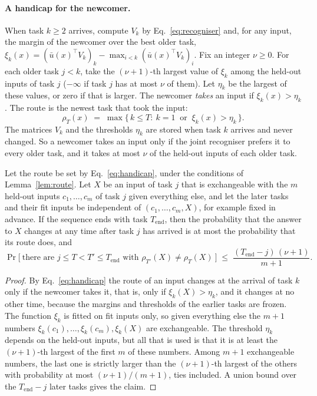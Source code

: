 \paragraph{A handicap for the newcomer.} When task $k \ge 2$ arrives, compute $V_k$ by
Eq.~\eqref{eq:recogniser} and, for any input, the margin of the newcomer over the best older task,
$\xi_k(x) = (\bar u(x)^{\!\top} V_k)_k - \max_{i < k} (\bar u(x)^{\!\top} V_k)_i$. Fix an integer
$\nu \ge 0$. For each older task $j < k$, take the $(\nu+1)$-th largest value of $\xi_k$ among the
held-out inputs of task $j$ ($-\infty$ if task $j$ has at most $\nu$ of them). Let $\eta_k$ be the
largest of these values, or zero if that is larger. The newcomer \emph{takes} an input if
$\xi_k(x) > \eta_k$. The route is the newest task that took the input:
\begin{equation}
  \rho_T(x) \;=\; \max\bigl\{\, k \le T : \ k = 1 \ \text{ or } \ \xi_k(x) > \eta_k \,\bigr\} .
  \label{eq:handicap}
\end{equation}
The matrices $V_k$ and the thresholds $\eta_k$ are stored when task $k$ arrives and never changed.
So a newcomer takes an input only if the joint recogniser prefers it to every older task, and it
takes at most $\nu$ of the held-out inputs of each older task.

\begin{theorem}
\label{thm:handicap}
Let the route be set by Eq.~\eqref{eq:handicap}, under the conditions of
Lemma~\ref{lem:route}. Let $X$ be an input of task $j$ that is exchangeable
with the $m$ held-out inputs $c_1, \dots, c_m$ of task $j$ given everything else, and let the
later tasks and their fit inputs be independent of $(c_1, \dots, c_m, X)$, for example fixed in
advance. If the sequence ends with task $T_{\mathrm{end}}$, then
the probability that the answer to $X$ changes at any time after task $j$ has arrived is at most
the probability that its route does, and
\[
  \Pr\bigl[\ \text{there are } j \le T < T' \le T_{\mathrm{end}} \text{ with } \rho_{T'}(X) \ne \rho_T(X) \ \bigr]
  \;\le\; \frac{(T_{\mathrm{end}} - j)\,(\nu+1)}{m+1} .
\]
\end{theorem}

\begin{proof}
By Eq.~\eqref{eq:handicap} the route of an input changes at the arrival of task $k$ only if the
newcomer takes it, that is, only if $\xi_k(X) > \eta_k$, and it changes at no other time, because
the margins and thresholds of the earlier tasks are frozen. The function $\xi_k$ is fitted on fit
inputs only, so given everything else the $m + 1$ numbers
$\xi_k(c_1), \dots, \xi_k(c_m), \xi_k(X)$ are exchangeable. The threshold $\eta_k$ depends on the
held-out inputs, but all that is used is that it is at least the $(\nu+1)$-th largest of the
first $m$ of these numbers. Among $m + 1$ exchangeable numbers, the last one is strictly larger
than the $(\nu+1)$-th largest of the others with probability at most $(\nu+1)/(m+1)$, ties
included. A union bound over the $T_{\mathrm{end}} - j$ later tasks gives the claim.
\end{proof}


